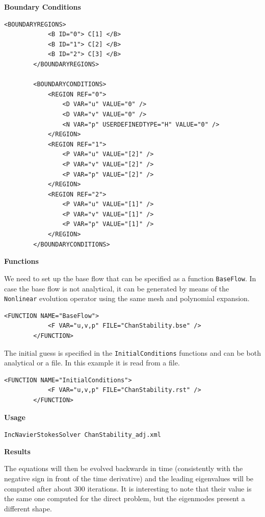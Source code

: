 \textbf{Boundary Conditions}

    \begin{lstlisting}[style=XMLStyle]
 <BOUNDARYREGIONS>
            <B ID="0"> C[1] </B>
            <B ID="1"> C[2] </B>
            <B ID="2"> C[3] </B>
        </BOUNDARYREGIONS>

        <BOUNDARYCONDITIONS>
            <REGION REF="0">
                <D VAR="u" VALUE="0" />
                <D VAR="v" VALUE="0" />
                <N VAR="p" USERDEFINEDTYPE="H" VALUE="0" />
            </REGION>
            <REGION REF="1">
                <P VAR="u" VALUE="[2]" />
                <P VAR="v" VALUE="[2]" />
                <P VAR="p" VALUE="[2]" />
            </REGION>
            <REGION REF="2">
                <P VAR="u" VALUE="[1]" />
                <P VAR="v" VALUE="[1]" />
                <P VAR="p" VALUE="[1]" />
            </REGION>
        </BOUNDARYCONDITIONS>
  \end{lstlisting}


\textbf{Functions}

We need to set up the base flow that can be specified as a function \texttt{BaseFlow}. In case the base flow is not analytical, it can be generated by means of the \texttt{Nonlinear} evolution operator using the same mesh and polynomial expansion.

    \begin{lstlisting}[style=XMLStyle]
        <FUNCTION NAME="BaseFlow">
            <F VAR="u,v,p" FILE="ChanStability.bse" />
        </FUNCTION>
  \end{lstlisting}
  
  The initial guess is specified in the \texttt{InitialConditions} functions and can be both analytical or a file. In this example it is read from a file. 
  
      \begin{lstlisting}[style=XMLStyle]
        <FUNCTION NAME="InitialConditions">
            <F VAR="u,v,p" FILE="ChanStability.rst" />
        </FUNCTION>
          \end{lstlisting}

\textbf{Usage}

\texttt{IncNavierStokesSolver ChanStability\_adj.xml}

\textbf{Results}

The equations will then be evolved backwards in time (consistently with the negative sign in front of the time derivative) and the leading eigenvalues will be computed after about 300 iterations. It is interesting to note that their value is the same one computed for the direct problem, but the eigenmodes present a different shape.


